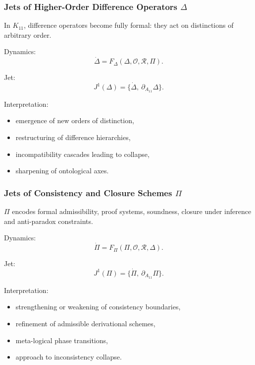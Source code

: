 \subsubsection{Jets of Higher-Order Difference Operators \texorpdfstring{$\Delta$}{\Delta}}

In $K_{11}$, difference operators become fully formal:
they act on distinctions of arbitrary order.

Dynamics:
\[
\dot{\Delta}
=
F_{\Delta}(\Delta,\mathcal{O},\mathcal{R},\Pi).
\]

Jet:
\[
J^1(\Delta)=\{\dot{\Delta},\ \partial_{A_{11}}\Delta\}.
\]

Interpretation:
\begin{itemize}
    \item emergence of new orders of distinction,
    \item restructuring of difference hierarchies,
    \item incompatibility cascades leading to collapse,
    \item sharpening of ontological axes.
\end{itemize}


\subsubsection{Jets of Consistency and Closure Schemes \texorpdfstring{$\Pi$}{\Pi}}

$\Pi$ encodes formal admissibility, proof systems, soundness,
closure under inference and anti-paradox constraints.

Dynamics:
\[
\dot{\Pi}
=
F_{\Pi}(\Pi,\mathcal{O},\mathcal{R},\Delta).
\]

Jet:
\[
J^1(\Pi)=\{\dot{\Pi},\ \partial_{A_{11}}\Pi\}.
\]

Interpretation:
\begin{itemize}
    \item strengthening or weakening of consistency boundaries,
    \item refinement of admissible derivational schemes,
    \item meta-logical phase transitions,
    \item approach to inconsistency collapse.
\end{itemize}


